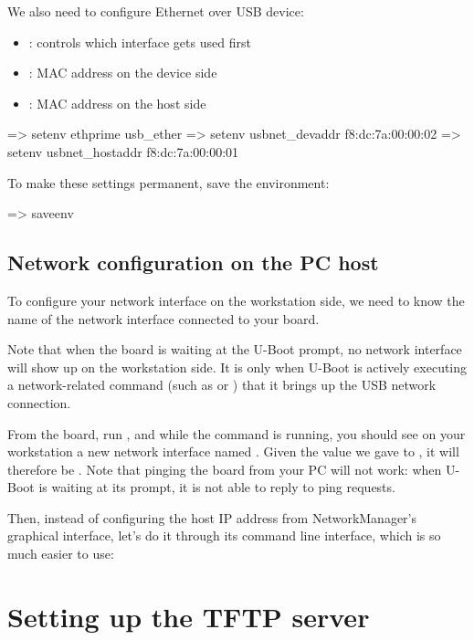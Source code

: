 We also need to configure Ethernet over USB device:
\begin{itemize}
  \item {}: controls which interface gets used first
  \item {}: MAC address on the device side
  \item {}: MAC address on the host side
\end{itemize}

\begin{ubootinput}
=> setenv ethprime usb_ether
=> setenv usbnet_devaddr f8:dc:7a:00:00:02
=> setenv usbnet_hostaddr f8:dc:7a:00:00:01
\end{ubootinput}

To make these settings permanent, save the environment:

\begin{ubootinput}
=> saveenv
\end{ubootinput}

\subsection{Network configuration on the PC host}

To configure your network interface on the workstation side, we need
to know the name of the network interface connected to your board.

Note that when the board is waiting at the U-Boot prompt, no network
interface will show up on the workstation side. It is only when U-Boot
is actively executing a network-related command (such as 
or ) that it brings up the USB network connection.

From the board, run , and while the 
command is running, you should see on your workstation a new network
interface named . Given the value we gave to
, it will therefore be
. Note that pinging the board from your PC will
not work: when U-Boot is waiting at its prompt, it is not able to
reply to ping requests.

Then, instead of configuring the host IP address from NetworkManager's
graphical interface, let's do it through its command line interface,
which is so much easier to use:


\section{Setting up the TFTP server}

